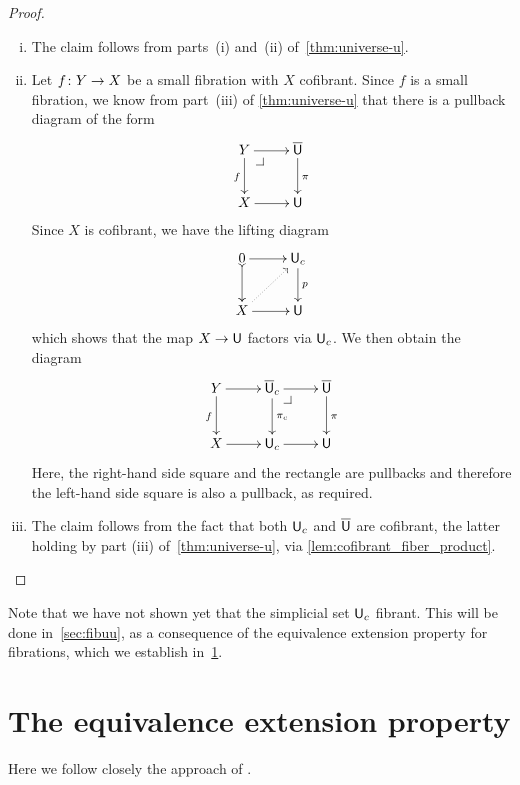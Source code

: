 \documentclass[reqno,10pt,a4paper,oneside,draft]{amsart}
\begin{document}
\begin{proof} \hfill
\begin{enumerate}[(i)] 
\item The claim follows from parts~(i) and~(ii) of~\cref{thm:universe-u}. 
\item Let $f \colon Y \to X$ be a small fibration with $X$ cofibrant. Since $f$ is a
small fibration, we know 
from part~(iii) of \cref{thm:universe-u} that there is a pullback diagram of the form 
\[
\xymatrix{
Y \ar[r] \ar[d]_f \drpullback & \UU \ar[d]^{\pi} \\
X \ar[r] & \U }
\]
Since $X$ is cofibrant, we have the lifting diagram
\[
\xymatrix{
0 \ar[r] \ar@{>->}[d] & \U_c \ar[d]^{p} \\
X \ar[r] \ar@{.>}[ur] & \U }
\]
which shows that the map $X \to \mathsf{U}$ factors via $\mathsf{U}_c$.  We then obtain the diagram
\[
\xymatrix{
Y \ar[r] \ar[d]_f &  \UU_c \ar[r]  \ar[d]^{\pi_c} \drpullback & \UU \ar[d]^{\pi} \\
X \ar[r] & \U_c \ar[r] &  \U }
\]
Here, the right-hand side square and the rectangle are pullbacks and therefore the left-hand
side square is also a pullback, as required. 
\item The claim follows from the fact that both $\mathsf{U}_c$ and
$\overline{\mathsf{U}}$ are cofibrant, the latter holding by part (iii) of~\cref{thm:universe-u}, via \cref{lem:cofibrant_fiber_product}. \qedhere
\end{enumerate} 
\end{proof} 





Note that we have not shown yet that the simplicial set $\mathsf{U}_c$ fibrant. This will be done in~\cref{sec:fibuu}, as a consequence of the equivalence extension property for fibrations, which we establish in~\cref{sec:equep}.

\newpage


\section{The equivalence extension property}
\label{sec:equep}


Here we follow closely the approach of \cite{voevodsky-simplicial-model}.
\end{document}
